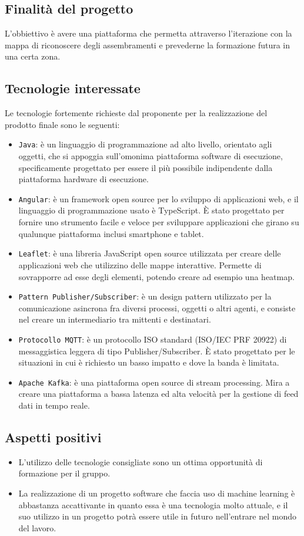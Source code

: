 \subsection{Finalità del progetto}
L'obbiettivo è avere una piattaforma che permetta attraverso l'iterazione con la mappa di riconoscere degli assembramenti e prevederne la formazione futura in una certa zona.

\subsection{Tecnologie interessate}
Le tecnologie fortemente richieste dal proponente per la realizzazione del prodotto finale sono le seguenti:
\begin{itemize}
    \item \verb|Java|: è un linguaggio di programmazione ad alto livello, orientato agli oggetti, che si appoggia sull'omonima piattaforma software di esecuzione, specificamente progettato per essere il più possibile indipendente dalla piattaforma hardware di esecuzione.
    \item \verb|Angular|: è un framework open source per lo sviluppo di applicazioni web, e il linguaggio di programmazione usato è TypeScript. È stato progettato per fornire uno strumento facile e veloce per sviluppare applicazioni che girano su qualunque piattaforma inclusi smartphone e tablet.
    \item \verb|Leaflet|: è una libreria JavaScript open source utilizzata per creare delle applicazioni web che utilizzino delle mappe interattive. Permette di sovrapporre ad esse degli elementi, potendo creare ad esempio una heatmap.
    \item \verb|Pattern Publisher/Subscriber|: è un design pattern utilizzato per la comunicazione asincrona fra diversi processi, oggetti o altri agenti, e consiste nel creare un intermediario tra mittenti e destinatari.
    \item \verb|Protocollo MQTT|: è un protocollo ISO standard (ISO/IEC PRF 20922) di messaggistica leggera di tipo Publisher/Subscriber. È stato progettato per le situazioni in cui è richiesto un basso impatto e dove la banda è limitata.
    \item \verb|Apache Kafka|: è una piattaforma open source di stream processing. Mira a creare una piattaforma a bassa latenza ed alta velocità per la gestione di feed dati in tempo reale.
\end{itemize}

\subsection{Aspetti positivi}
\begin{itemize}
    \item L’utilizzo delle tecnologie consigliate sono un ottima opportunità di formazione per il gruppo.
    \item La realizzazione di un progetto software che faccia uso di machine learning è abbastanza accattivante in quanto essa è una tecnologia molto attuale, e il suo utilizzo in un progetto potrà essere utile in futuro nell’entrare nel mondo del lavoro.
\end{itemize}

